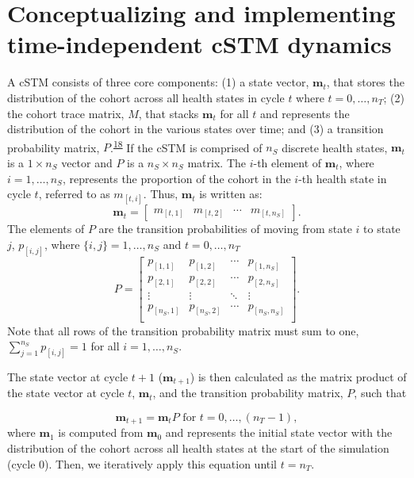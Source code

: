 \documentclass[
]{article}
\begin{document}
\hypertarget{conceptualizing-and-implementing-time-independent-cstm-dynamics}{%
\section{Conceptualizing and implementing time-independent cSTM dynamics}\label{conceptualizing-and-implementing-time-independent-cstm-dynamics}}

A cSTM consists of three core components: (1) a state vector, \(\mathbf{m}_t\), that stores the distribution of the cohort across all health states in cycle \(t\) where \(t = 0,\ldots, n_T\); (2) the cohort trace matrix, \(M\), that stacks \(\mathbf{m}_t\) for all \(t\) and represents the distribution of the cohort in the various states over time; and (3) a transition probability matrix, \(P\).\textsuperscript{\protect\hyperlink{ref-Iskandar2018a}{18}} If the cSTM is comprised of \(n_S\) discrete health states, \(\mathbf{m}_t\) is a \(1 \times n_S\) vector and \(P\) is a \(n_S \times n_S\) matrix. The \(i\)-th element of \(\mathbf{m}_t\), where \(i = 1,\ldots, n_S\), represents the proportion of the cohort in the \(i\)-th health state in cycle \(t\), referred to as \(m_{[t,i]}\). Thus, \(\mathbf{m}_t\) is written as:
\[
\mathbf{m}_t =
  \begin{bmatrix}
m_{[t,1]} & m_{[t,2]} & \cdots & m_{[t,n_S]}
\end{bmatrix}.
\]
The elements of \(P\) are the transition probabilities of moving from state \(i\) to state \(j\), \(p_{[i,j]}\), where \(\{i,j\} = 1,\ldots, n_S\) and \(t = 0,\ldots,n_T\)
\[
  P = 
  \begin{bmatrix}
    p_{[1,1]} & p_{[1,2]} & \cdots & p_{[1,n_S]} \\
    p_{[2,1]} & p_{[2,2]} & \cdots & p_{[2,n_S]} \\
    \vdots    & \vdots  & \ddots & \vdots   \\
    p_{[n_S,1]} & p_{[n_S,2]} & \cdots & p_{[n_S,n_S]} \\
  \end{bmatrix}.
\]
Note that all rows of the transition probability matrix must sum to one, \(\sum_{j=1}^{n_S}{p_{[i,j]}} = 1\) for all \(i = 1,\ldots,n_S\).

The state vector at cycle \(t+1\) (\(\mathbf{m}_{t+1}\)) is then calculated as the matrix product of the state vector at cycle \(t\), \(\mathbf{m}_{t}\), and the transition probability matrix, \(P\), such that

\[
  \mathbf{m}_{t+1} = \mathbf{m}_{t} P \text{ for } t = 0,\ldots, (n_T - 1),
\]
where \(\mathbf{m}_1\) is computed from \(\mathbf{m}_{0}\) and represents the initial state vector with the distribution of the cohort across all health states at the start of the simulation (cycle 0). Then, we iteratively apply this equation until \(t = n_T\).
\end{document}
